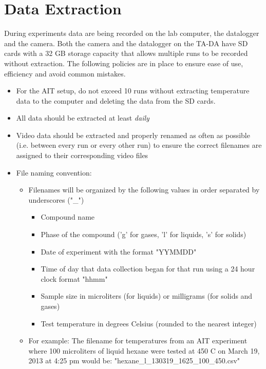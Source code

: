 \documentclass[letterpaper,11pt]{article}
\begin{document}
\section{Data Extraction} 
During experiments data are being recorded on the lab computer, the datalogger 
and the camera. Both the camera and the datalogger on the TA-DA have SD cards 
with a 32 GB storage capacity that allows multiple runs to be recorded without 
extraction. The following policies are in place to ensure ease of use, 
efficiency and avoid common mistakes.
    \begin{itemize} 
    \item For the AIT setup, do not exceed 10 runs without extracting 
        temperature data to the computer and deleting the data from the SD  
        cards.
    \item All data should be extracted at least \textit{daily}
    \item Video data should be extracted and properly renamed as often as  
        possible (i.e. between every run or every other run) to ensure the 
        correct filenames are assigned to their corresponding video files
    
    \item File naming convention: 
        \begin{itemize}
        \item Filenames will be organized by the following values in order 
            separated by underscores ("\_")
                \begin{itemize}
                \item Compound name
                \item Phase of the compound ('g' for gases, 'l' for liquids,
                    's' for solids)
                \item Date of experiment with the format "YYMMDD"
                \item Time of day that data collection began for that run
                    using a 24 hour clock format "hhmm"
                \item Sample size in microliters (for liquids) or milligrams
                    (for solids and gases)
                \item Test temperature in degrees Celsius (rounded to the 
                    nearest integer)
                \end{itemize}
                
        \item For example: The filename for temperatures from an AIT experiment  
            where 100 microliters of liquid hexane were tested at 450
             \degree C on March 19, 2013 at 4:25 pm would be: \newline 
            "hexane\_l\_130319\_1625\_100\_450.csv"
        \end{itemize}


\end{itemize}
\end{document}
